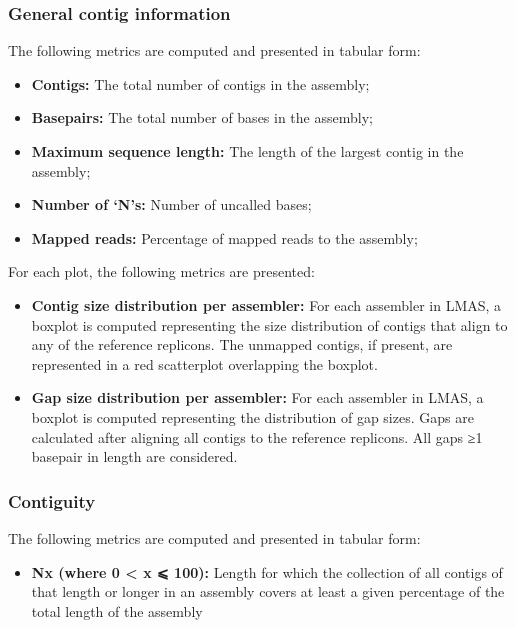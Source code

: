 \subsubsection{General contig information}

The following metrics are computed and presented in tabular form: 

\begin{itemize}
    \item \textbf{Contigs:} The total number of contigs in the assembly;
    \item \textbf{Basepairs:} The total number of bases in the assembly;
    \item \textbf{Maximum sequence length:} The length of the largest contig in the assembly;
    \item \textbf{Number of ‘N’s:} Number of uncalled bases;
    \item \textbf{Mapped reads:} Percentage of mapped reads to the assembly;
\end{itemize}

For each plot, the following metrics are presented:

\begin{itemize}
    \item \textbf{Contig size distribution per assembler:} For each assembler in LMAS, a boxplot is computed representing the size distribution of contigs that align to any of the reference replicons. The unmapped contigs, if present, are represented in a red scatterplot overlapping the boxplot. 
    \item \textbf{Gap size distribution per assembler:} For each assembler in LMAS, a boxplot is computed representing the distribution of gap sizes. Gaps are calculated after aligning all contigs to the reference replicons. All gaps ≥1 basepair in length are considered. 
\end{itemize}

\subsubsection{Contiguity}

The following metrics are computed and presented in tabular form:

\begin{itemize}
    \item \textbf{Nx (where 0  < x  ⩽ 100):} Length for which the collection of all contigs of that length or longer in an assembly covers at least a given percentage of the total length of the assembly
\end{itemize}

